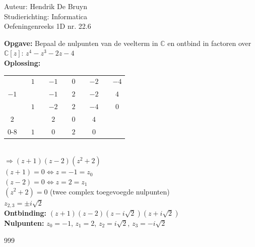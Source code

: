 \documentclass[a4paper]{article}
\begin{document}
  
\noindent \large Auteur: Hendrik De Bruyn \\
\noindent \large Studierichting: Informatica\\
\noindent \large Oefeningenreeks 1D nr. 22.6\\

\medskip

\normalsize

\textbf{Opgave:} Bepaal de nulpunten van de veelterm in $\mathbb{C}$ en ontbind in factoren over $\mathbb{C}[z]$: $z^4 - z^3 -2z -4$ \\

\textbf{Oplossing:} \\

\begin{tabular}{c|cccccccccc}
         && $1$ && $-1$ && $0$ &       & $-2$ &       & $-4$ \\
    $-1$ &&     && $-1$ && $2$ &       & $-2$ &       & $4$  \\ \hline
         && $1$ && $-2$ && $2$ &       & $-4$ &\vline & $0$  \\
    $2$  &&     && $2$  && $0$ &       & $4$  &       &      \\ \cline{0-8}
         && $1$ && $0$  && $2$ &\vline & $0$  &       &      \\
\end{tabular} \\

$\Rightarrow (z + 1)(z - 2)(z^2 + 2)$ \\

$(z + 1) = 0 \Leftrightarrow z = -1 = z_0$ \\

$(z - 2) = 0 \Leftrightarrow z = 2 = z_1$ \\

$(z^2 + 2) = 0$ (twee complex toegevoegde nulpunten) \\

$z_{2,3} = \pm i\sqrt{2}$ \\

\textbf{Ontbinding:} $(z+1)(z-2)(z-i\sqrt{2})(z+i\sqrt{2})$ \\

\textbf{Nulpunten:} $z_0 = -1$, $z_1 = 2$, $z_2 = i\sqrt{2}$, $z_3 = -i\sqrt{2}$  \\


\begin{thebibliography}{999}
\end{thebibliography}
\end{document}
